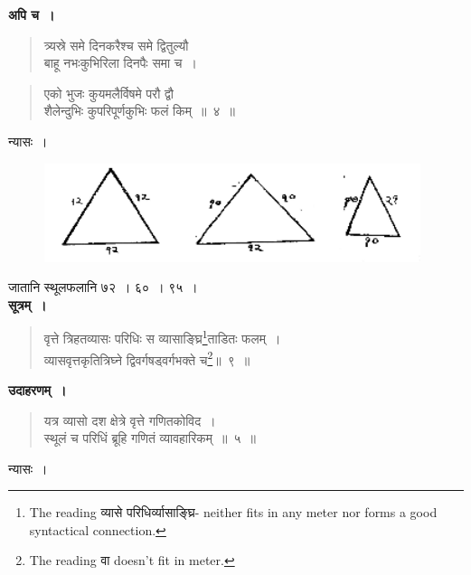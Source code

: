 \documentclass[11pt, openany]{book}
\begin{document}
\textbf{अपि च~। }
\begin{quote}
    \bqt 
    त्र्यस्रे समे दिनकरैश्च समे द्वितुल्यौ \\
    बाहू नभःकुभिरिला दिनपैः समा च~।
\end{quote}

\newpage
\setcounter{footnote}{0}

\begin{quote}
    \bqt 
एको भुजः कुयमलैर्विषमे परौ द्वौ \\
शैलेन्दुभिः कुपरिपूर्णकुभिः फलं किम्~॥~४~॥
\end{quote}

 न्यासः~।

\begin{figure}[h!]
    \centering
    \includegraphics[width=110mm]{graphics/capture3.png}
\end{figure}

 जातानि स्थूलफलानि ७२~। ६०~। ९५~। \\

\vspace{-2mm}
\textbf{सूत्रम्~। }
\begin{quote}
    \bs 
    वृत्ते त्रिहतव्यासः परिधिः स व्यासाङ्घ्रि\footnote{The reading व्यासे परिधिर्व्यासाङ्घ्रि- neither fits in any meter nor forms a good syntactical connection.}ताडितः फलम्~।\\
व्यासवृत्तकृतित्रिघ्ने द्विवर्गषड्वर्गभक्ते च\footnote{The reading वा doesn't fit in meter.}॥~९~॥
\end{quote}

\textbf{उदाहरणम्~। }
\begin{quote}
    \bqt 
    यत्र व्यासो दश क्षेत्रे वृत्ते गणितकोविद~।\\
स्थूलं च परिधिं ब्रूहि गणितं व्यावहारिकम्~॥~५~॥
\end{quote}

 न्यासः~। 
 \vspace{-4mm}
 
\end{document}
